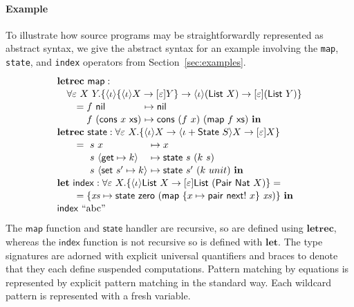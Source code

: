 \documentclass[11pt]{article}
\makeatletter
\newcommand\ba{\begin{array}}
\newcommand\ea{\end{array}}
\newcommand{\bl}{\ba[t]{@{}l@{}}}
\newcommand{\el}{\ea}
\newcommand{\key}[1]{\textbf{#1}} %
\newcommand{\var}{\mathit}        %
\newcommand{\op}{\mathsf}  %
\newcommand{\con}{\mathsf} %
\newcommand{\inter}{\mathsf} %
\newcommand{\str}[1]{\textrm{``#1''}} %
\newcommand{\thunk}[1]{\{{#1}\}}
\newcommand{\evd}{\varepsilon}
\newcommand{\effin}[1]{\langle {#1} \rangle}
\newcommand{\effout}[1]{[{#1}]}
\newcommand{\id}{\iota}
\makeatother
\begin{document}
\paragraph{Example}
To illustrate how source programs may be straightforwardly represented
as abstract syntax, we give the abstract syntax for an example
involving the \verb!map!, \verb!state!, and \verb!index!  operators
from Section~\ref{sec:examples}.
%
\[
\def\arraystretch{1.1}
\bl
\key{letrec}~\op{map} : \\
\quad
   \forall \evd~X~Y.
      \thunk{\effin{\id}\thunk{\effin{\id}X \to \effout{\evd}Y}
               \to \effin{\id}(\con{List}~X) \to \effout{\evd}(\con{List}~Y)} \\
\qquad =
       \ba[t]{@{}r@{}l@{}l@{}}
                           & f~\con{nil}               &~\mapsto \con{nil} \\
                           & f~(\con{cons}~x~\con{xs}) &~\mapsto \con{cons}~(f~x)~(\op{map}~f~\con{xs}) ~\key{in} \\
       \ea \\
\key{letrec}~\op{state} : \forall \evd~X.\thunk{\effin{\id}X \to \effin{\id + \inter{State}~S}X \to \effout{\evd}X} \\
\qquad =
     \ba[t]{@{}r@{~}l@{~}l@{~}l@{}}
              & s & x &\mapsto x \\
              & s & \effin{\op{get} \mapsto k} &\mapsto \op{state}~s~(k~s) \\
              & s & \effin{\op{set}~s' \mapsto k} &\mapsto \op{state}~s'~(k~unit)~\key{in} \\
     \ea \\
\key{let}~\op{index} : \forall \evd~X.\thunk{\effin{\id}\con{List}~X \to \effout{\evd}\con{List}~(\con{Pair}~\con{Nat}~X)} = \\
\qquad =
    \{                      \var{xs} \mapsto \op{state}~\con{zero}~(\op{map}~\thunk{x \mapsto \op{pair}~\op{next}!~x}~\var{xs})\}~\key{in} \\
\op{index}~\str{abc} \\
\el
\]
%
The $\op{map}$ function and $\op{state}$ handler are recursive, so are
defined using $\key{letrec}$, whereas the $\op{index}$ function is not
recursive so is defined with $\key{let}$. The type signatures are
adorned with explicit universal quantifiers and braces to denote that
they each define suspended computations. Pattern matching by equations
is represented by explicit pattern matching in the standard way. Each
wildcard pattern is represented with a fresh variable.
\end{document}
